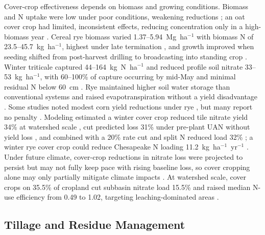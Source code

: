 Cover-crop effectiveness depends on biomass and growing conditions. Biomass and N uptake were low under poor conditions, weakening reductions \parencite{PrezaFontes2021}; an oat cover crop had limited, inconsistent effects, reducing concentration only in a high-biomass year \parencite{OBrien2022}. Cereal rye biomass varied 1.37--5.94~Mg~ha$^{-1}$ with biomass N of 23.5--45.7~kg~ha$^{-1}$, highest under late termination \parencite{Gentry2025}, and growth improved when seeding shifted from post-harvest drilling to broadcasting into standing crop \parencite{Waring2024}. Winter triticale captured 44--164~kg~N~ha$^{-1}$ and reduced profile soil nitrate 33--53~kg~ha$^{-1}$, with 60--100\% of capture occurring by mid-May and minimal residual N below 60~cm \parencite{Nance2007}. Rye maintained higher soil water storage than conventional systems and raised evapotranspiration without a yield disadvantage \parencite{Qi2011}. Some studies noted modest corn yield reductions under rye \parencite{Ruffatti2019,Dougherty2020}, but many report no penalty \parencite{OBrien2022,PrezaFontes2021,Gentry2025}. Modeling estimated a winter cover crop reduced tile nitrate yield 34\% at watershed scale \parencite{David2015}, cut predicted loss 31\% under pre-plant UAN without yield loss \parencite{Malone2007b}, and combined with a 20\% rate cut and split N reduced load 32\% \parencite{Singh2023}; a winter rye cover crop could reduce Chesapeake N loading 11.2~kg~ha$^{-1}$~yr$^{-1}$ \parencite{Woodbury2018}. Under future climate, cover-crop reductions in nitrate loss were projected to persist but may not fully keep pace with rising baseline loss, so cover cropping alone may only partially mitigate climate impacts \parencite{Gupta2023}. At watershed scale, cover crops on 35.5\% of cropland cut subbasin nitrate load 15.5\% and raised median N-use efficiency from 0.49 to 1.02, targeting leaching-dominated areas \parencite{Makhtoumi2025}.

\subsection{Tillage and Residue Management}

